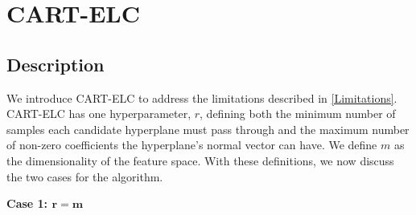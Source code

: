 \documentclass[10pt]{article} %
\begin{document}
\section{CART-ELC}\label{algorithm}

\subsection{Description}\label{Description}

We introduce CART-ELC to address the limitations described in \autoref{Limitations}. CART-ELC has one hyperparameter, $r$, defining both the minimum number of samples each candidate hyperplane must pass through and the maximum number of non-zero coefficients the hyperplane's normal vector can have. We define $m$ as the dimensionality of the feature space. With these definitions, we now discuss the two cases for the algorithm.

\textbf{Case 1: $\mathbf{r = m}$}
\end{document}

